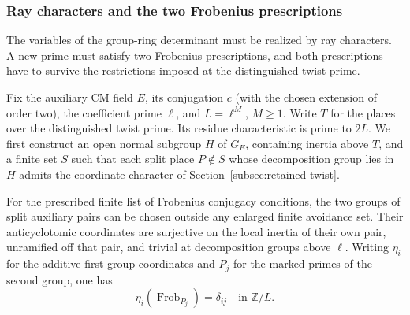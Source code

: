 \subsubsection*{Ray characters and the two Frobenius prescriptions}
\label{subsec:aux-coordinates}
\hypertarget{source-auxiliary-coordinates}{}

The variables of the group-ring determinant must be realized by ray characters. A new prime must satisfy two Frobenius prescriptions, and both prescriptions have to survive the restrictions imposed at the distinguished twist prime.

Fix the auxiliary CM field \(E\), its conjugation \(c\) (with the chosen
extension of order two), the coefficient prime \(\ell\), and
\(L=\ell^M\), \(M\ge1\). Write \(T\) for the places over the
distinguished twist prime. Its residue characteristic is prime
to \(2L\). We first construct an open normal subgroup \(H\)
of \(G_E\), containing inertia above \(T\), and a finite set
\(S\) such that each split place \(P\notin S\) whose
decomposition group lies in \(H\) admits the coordinate
character of Section~\ref{subsec:retained-twist}.

\begin{proposition}\label{prop:ray-coordinate-pairs}
For the prescribed finite list of Frobenius conjugacy
conditions, the two groups of split auxiliary pairs can
be chosen outside any enlarged finite avoidance set.
Their anticyclotomic coordinates are surjective on the local
inertia of their own pair, unramified off that pair, and
trivial at decomposition groups above \(\ell\). Writing \(\eta_i\) for the additive first-group coordinates and \(P_j\) for the marked primes of the second group, one has
\[
 \eta_i(\operatorname{Frob}_{P_j})=\delta_{ij}\quad\text{in }\mathbb Z/L.
\]
\end{proposition}

